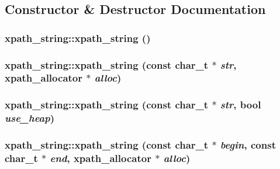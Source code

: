 \subsection{Constructor \& Destructor Documentation}
\hypertarget{classxpath__string_a6c415f55011c6b816446d7454d1e9d2c}{
\subsubsection[{xpath\_\-string}]{\setlength{\rightskip}{0pt plus 5cm}xpath\_\-string::xpath\_\-string ()}}
\label{classxpath__string_a6c415f55011c6b816446d7454d1e9d2c}
\hypertarget{classxpath__string_aac8b63876bb7f9ad6f709e8b2c823557}{
\subsubsection[{xpath\_\-string}]{\setlength{\rightskip}{0pt plus 5cm}xpath\_\-string::xpath\_\-string (const char\_\-t $\ast$ {\em str}, \/  {\bf xpath\_\-allocator} $\ast$ {\em alloc})}}
\label{classxpath__string_aac8b63876bb7f9ad6f709e8b2c823557}
\hypertarget{classxpath__string_ae0661540ff7edecdf8a74f919b15f2eb}{
\subsubsection[{xpath\_\-string}]{\setlength{\rightskip}{0pt plus 5cm}xpath\_\-string::xpath\_\-string (const char\_\-t $\ast$ {\em str}, \/  bool {\em use\_\-heap})}}
\label{classxpath__string_ae0661540ff7edecdf8a74f919b15f2eb}
\hypertarget{classxpath__string_ac46dc4ad206c24ade43acff34c241883}{
\subsubsection[{xpath\_\-string}]{\setlength{\rightskip}{0pt plus 5cm}xpath\_\-string::xpath\_\-string (const char\_\-t $\ast$ {\em begin}, \/  const char\_\-t $\ast$ {\em end}, \/  {\bf xpath\_\-allocator} $\ast$ {\em alloc})}}
\label{classxpath__string_ac46dc4ad206c24ade43acff34c241883}


